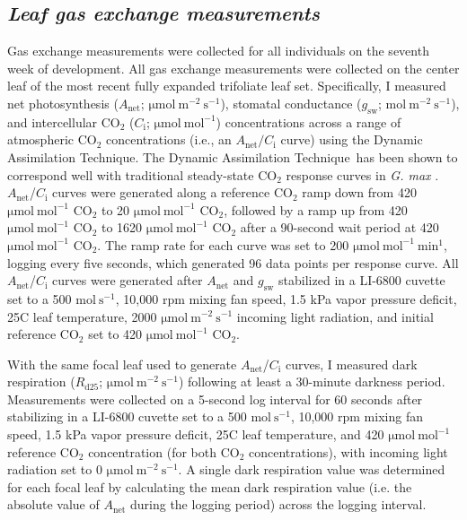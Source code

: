 \subsection{\textit{Leaf gas exchange measurements}}
\noindent Gas exchange measurements were collected for all individuals on the seventh week of development. All gas exchange measurements were collected on the center leaf of the most recent fully expanded trifoliate leaf set. Specifically, I measured net photosynthesis ($A_\mathrm{net}$; $\mathrm{\mu mol\ m^{-2}\ s^{-1}}$), stomatal conductance ($g_\mathrm{sw}$; $\mathrm{mol\ m^{-2}\ s^{-1}}$), and intercellular CO$_2$ ($C_\mathrm{i}$; $\mathrm{\mu mol\ mol^{-1}}$) concentrations across a range of atmospheric CO$_2$ concentrations (i.e., an $A_\mathrm{net}/C_\mathrm{i}$ curve) using the Dynamic Assimilation Technique\texttrademark. The Dynamic Assimilation Technique\texttrademark\ has been shown to correspond well with traditional steady-state CO$_2$ response curves in \textit{G. max} . $A_\mathrm{net}$/$C_\mathrm{i}$ curves were generated along a reference CO$_2$ ramp down from 420 $\mathrm{\mu mol\ mol^{-1}}$ CO$_2$ to 20 $\mathrm{\mu mol\ mol^{-1}}$ CO$_2$, followed by a ramp up from 420 $\mathrm{\mu mol\ mol^{-1}}$ CO$_2$ to 1620 $\mathrm{\mu mol\ mol^{-1}}$ CO$_2$ after a 90-second wait period at 420 $\mathrm{\mu mol\ mol^{-1}}$ CO$_2$. The ramp rate for each curve was set to 200 $\mathrm{\mu mol\ mol^{-1}\ min^{1}}$, logging every five seconds, which generated 96 data points per response curve. All $A_\mathrm{net}$/$C_\mathrm{i}$ curves were generated after $A_\mathrm{net}$ and $g_\mathrm{sw}$ stabilized in a LI-6800 cuvette set to a 500 $\mathrm{mol\ s^{-1}}$, 10,000 rpm mixing fan speed, 1.5 kPa vapor pressure deficit, 25\textdegree{}C leaf temperature, 2000 $\mathrm{\mu mol\ m^{-2}\ s^{-1}}$ incoming light radiation, and initial reference CO$_2$ set to 420 $\mathrm{\mu mol\ mol^{-1}}$ CO$_2$.

With the same focal leaf used to generate $A_\mathrm{net}$/$C_\mathrm{i}$ curves, I measured dark respiration ($R_\mathrm{d25}$; $\mathrm{\mu mol\ m^{-2}\ s^{-1}}$) following at least a 30-minute darkness period. Measurements were collected on a 5-second log interval for 60 seconds after stabilizing in a LI-6800 cuvette set to a 500 $\mathrm{mol\ s^{-1}}$, 10,000 rpm mixing fan speed, 1.5 kPa vapor pressure deficit, 25\textdegree{}C leaf temperature, and 420 $\mathrm{\mu mol\ mol^{-1}}$ reference CO$_2$ concentration (for both CO$_2$ concentrations), with incoming light radiation set to 0 $\mathrm{\mu mol\ m^{-2}\ s^{-1}}$. A single dark respiration value was determined for each focal leaf by calculating the mean dark respiration value (i.e. the absolute value of $A_\mathrm{net}$ during the logging period) across the logging interval.

